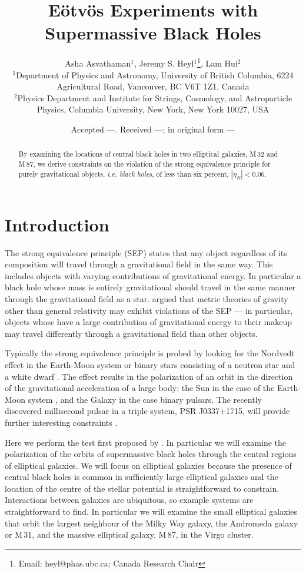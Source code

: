 \documentclass[useAMS,usenatbib]{mn2e}
\title[E\"otv\"os Experiments]{E\"otv\"os Experiments with 
  Supermassive Black Holes  }
\author[Asvathaman, Heyl \& Hui]{Asha Asvathaman$^{1}$, Jeremy S. Heyl$^{1}$\thanks{Email:
    heyl@phas.ubc.ca; Canada Research Chair}, Lam Hui$^{2}$ \\
$^{1}$Department of Physics and Astronomy, University of British
  Columbia, 6224 Agricultural Road, Vancouver, BC V6T 1Z1, Canada\\
  $^{2}$Physics Department and Institute for Strings, Cosmology, and Astroparticle Physics, Columbia University, New York, New York 10027, USA}
\begin{document}
\date{Accepted ---. Received ---; in original form ---}

\pagerange{\pageref{firstpage}--\pageref{lastpage}} 

\maketitle

\label{firstpage}

\begin{abstract}
  By examining the locations of central black holes in two elliptical
  galaxies, M\,32 and M\,87, we derive constraints on the violation of
  the strong equivalence principle for purely gravitational objects,
  {\em i.e. black holes}, of less than six percent, $|\eta_N|<0.06$.
\end{abstract}

\section{Introduction}

The strong equivalence principle (SEP) states that any object
regardless of its composition will travel through a gravitational
field in the same way.  This includes objects with varying
contributions of gravitational energy.  In particular a black hole
whose mass is entirely gravitational should travel in the same manner
through the gravitational field as a
star. \citet{1968PhRv..169.1014N,1968PhRv..169.1017N} argued that
metric theories of gravity other than general relativity may exhibit
violations of the SEP --- in particular,
objects whose have a large contribution of gravitational energy to
their makeup may travel differently through a gravitational field than
other objects.

Typically the strong equivalence principle is probed by looking for
the Nordvedt effect in the Earth-Moon system or binary stars
consisting of a neutron star and a white dwarf \citep{Stairs:2005}.
The \citet{1968PhRv..170.1186N} effect results in the polarization of
an orbit in the direction of the gravitational acceleration of a large
body: the Sun in the case of the Earth-Moon system
\citep{1976PhRvL..36..551W,1976PhRvL..36..555S}, and the Galaxy in the
case binary pulsars.  The recently discovered millisecond pulsar in a
triple system, PSR J0337+1715, will provide further interesting
constraints \citep{Ransom:2014aa}.

Here we perform the test first proposed by \cite{2012PhRvL.109e1304H}.
In particular we will examine the polarization of the orbits of
supermassive black holes through the central regions of elliptical
galaxies.  We will focus on elliptical galaxies because the presence
of central black holes is common in sufficiently large elliptical
galaxies and the location of the centre of the stellar potential is
straightforward to constrain.  Interactions between galaxies are
ubiquitous, so example systems are straightforward to find.  In
particular we will examine the small elliptical galaxies that orbit
the largest neighbour of the Milky Way galaxy, the Andromeda galaxy or
M\,31, and the massive elliptical galaxy, M\,87, in the Virgo cluster.
\end{document}
